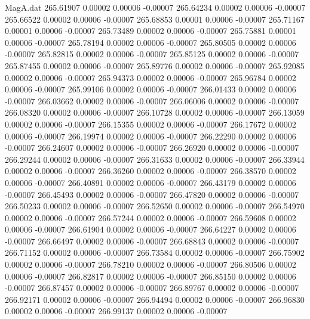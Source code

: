 \begin{filecontents}{MagA.dat}
 265.61907    0.00002    0.00006   -0.00007
 265.64234    0.00002    0.00006   -0.00007
 265.66522    0.00002    0.00006   -0.00007
 265.68853    0.00001    0.00006   -0.00007
 265.71167    0.00001    0.00006   -0.00007
 265.73489    0.00002    0.00006   -0.00007
 265.75881    0.00001    0.00006   -0.00007
 265.78194    0.00002    0.00006   -0.00007
 265.80505    0.00002    0.00006   -0.00007
 265.82815    0.00002    0.00006   -0.00007
 265.85125    0.00002    0.00006   -0.00007
 265.87455    0.00002    0.00006   -0.00007
 265.89776    0.00002    0.00006   -0.00007
 265.92085    0.00002    0.00006   -0.00007
 265.94373    0.00002    0.00006   -0.00007
 265.96784    0.00002    0.00006   -0.00007
 265.99106    0.00002    0.00006   -0.00007
 266.01433    0.00002    0.00006   -0.00007
 266.03662    0.00002    0.00006   -0.00007
 266.06006    0.00002    0.00006   -0.00007
 266.08320    0.00002    0.00006   -0.00007
 266.10728    0.00002    0.00006   -0.00007
 266.13059    0.00002    0.00006   -0.00007
 266.15355    0.00002    0.00006   -0.00007
 266.17672    0.00002    0.00006   -0.00007
 266.19974    0.00002    0.00006   -0.00007
 266.22290    0.00002    0.00006   -0.00007
 266.24607    0.00002    0.00006   -0.00007
 266.26920    0.00002    0.00006   -0.00007
 266.29244    0.00002    0.00006   -0.00007
 266.31633    0.00002    0.00006   -0.00007
 266.33944    0.00002    0.00006   -0.00007
 266.36260    0.00002    0.00006   -0.00007
 266.38570    0.00002    0.00006   -0.00007
 266.40891    0.00002    0.00006   -0.00007
 266.43179    0.00002    0.00006   -0.00007
 266.45493    0.00002    0.00006   -0.00007
 266.47820    0.00002    0.00006   -0.00007
 266.50233    0.00002    0.00006   -0.00007
 266.52650    0.00002    0.00006   -0.00007
 266.54970    0.00002    0.00006   -0.00007
 266.57244    0.00002    0.00006   -0.00007
 266.59608    0.00002    0.00006   -0.00007
 266.61904    0.00002    0.00006   -0.00007
 266.64227    0.00002    0.00006   -0.00007
 266.66497    0.00002    0.00006   -0.00007
 266.68843    0.00002    0.00006   -0.00007
 266.71152    0.00002    0.00006   -0.00007
 266.73584    0.00002    0.00006   -0.00007
 266.75902    0.00002    0.00006   -0.00007
 266.78210    0.00002    0.00006   -0.00007
 266.80506    0.00002    0.00006   -0.00007
 266.82817    0.00002    0.00006   -0.00007
 266.85150    0.00002    0.00006   -0.00007
 266.87457    0.00002    0.00006   -0.00007
 266.89767    0.00002    0.00006   -0.00007
 266.92171    0.00002    0.00006   -0.00007
 266.94494    0.00002    0.00006   -0.00007
 266.96830    0.00002    0.00006   -0.00007
 266.99137    0.00002    0.00006   -0.00007

\end{filecontents}
